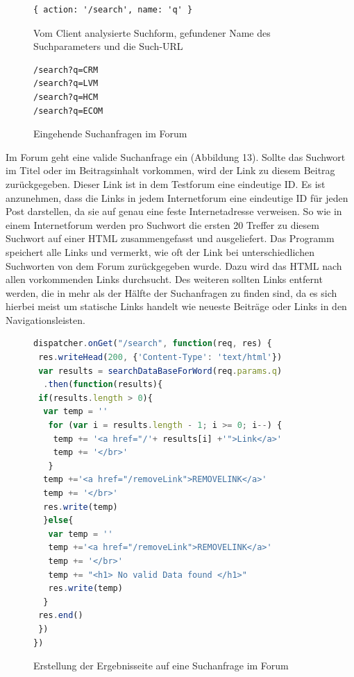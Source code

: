 \begin{figure}[ht]
\begin{lstlisting}[language=HTML5]
{ action: '/search', name: 'q' }
\end{lstlisting}
\caption{Vom Client analysierte Suchform, gefundener Name des Suchparameters und die Such-URL}
\end{figure}


\begin{figure}[ht]
\begin{lstlisting}[language=HTML5]
/search?q=CRM
/search?q=LVM
/search?q=HCM
/search?q=ECOM
\end{lstlisting}
\caption{Eingehende Suchanfragen im Forum }
\end{figure}
Im Forum geht eine valide Suchanfrage ein (Abbildung 13).
Sollte das Suchwort im Titel oder im Beitragsinhalt vorkommen, wird der Link zu diesem Beitrag zurückgegeben. Dieser Link ist in dem Testforum eine eindeutige ID. Es ist anzunehmen, dass die Links in jedem Internetforum eine eindeutige ID für jeden Post darstellen, da sie auf genau eine feste Internetadresse verweisen. So wie in einem Internetforum werden pro Suchwort die ersten 20 Treffer zu diesem Suchwort auf einer HTML zusammengefasst und ausgeliefert. Das Programm speichert alle Links und vermerkt, wie oft der Link bei unterschiedlichen Suchworten von dem Forum zurückgegeben wurde. Dazu wird das HTML nach allen vorkommenden Links durchsucht. Des weiteren sollten Links entfernt werden, die in mehr als der Hälfte der Suchanfragen zu finden sind, da es sich hierbei meist um statische Links handelt wie neueste Beiträge oder Links in den Navigationsleisten.
\newpage

\begin{figure}[h!]
\begin{lstlisting}[language=JavaScript]
dispatcher.onGet("/search", function(req, res) {
 res.writeHead(200, {'Content-Type': 'text/html'})
 var results = searchDataBaseForWord(req.params.q)
  .then(function(results){
 if(results.length > 0){
  var temp = ''
   for (var i = results.length - 1; i >= 0; i--) {
    temp += '<a href="/'+ results[i] +'">Link</a>'
    temp += '</br>'
   }
  temp +='<a href="/removeLink">REMOVELINK</a>'
  temp += '</br>'
  res.write(temp)
  }else{
   var temp = ''
   temp +='<a href="/removeLink">REMOVELINK</a>'
   temp += '</br>'
   temp += "<h1> No valid Data found </h1>"
   res.write(temp)
  }
 res.end() 
 }) 
})
\end{lstlisting}
\caption{Erstellung der Ergebnisseite auf eine Suchanfrage im Forum}
\end{figure}


